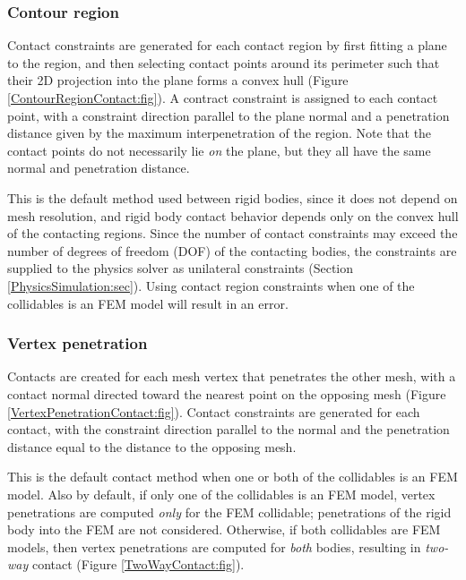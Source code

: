 \subsubsection{Contour region}
\label{ContourRegion:sec}

Contact constraints are generated for each contact region by first
fitting a plane to the region, and then selecting contact points
around its perimeter such that their 2D projection into the plane
forms a convex hull (Figure \ref{ContourRegionContact:fig}).  A
contract constraint is assigned to each contact point, with a
constraint direction parallel to the plane normal and a penetration
distance given by the maximum interpenetration of the region. Note
that the contact points do not necessarily lie {\it on} the plane, but
they all have the same normal and penetration distance.

This is the default method used between rigid bodies, since it does
not depend on mesh resolution, and rigid body contact behavior depends
only on the convex hull of the contacting regions. Since the number of
contact constraints may exceed the number of degrees of freedom (DOF)
of the contacting bodies, the constraints are supplied to the physics
solver as unilateral constraints
(Section \ref{PhysicsSimulation:sec}).  Using contact region
constraints when one of the collidables is an FEM model will result in
an error.

\subsubsection{Vertex penetration}
\label{VertexPenetration:sec}

Contacts are created for each mesh vertex that penetrates the other
mesh, with a contact normal directed toward the nearest point on the
opposing mesh (Figure \ref{VertexPenetrationContact:fig}).  Contact
constraints are generated for each contact, with the constraint
direction parallel to the normal and the penetration distance equal to
the distance to the opposing mesh.

This is the default contact method when one or both of the
collidables is an FEM model. Also by default, if only one of the
collidables is an FEM model, vertex penetrations are computed {\it
only} for the FEM collidable; penetrations of the rigid body into the
FEM are not considered. Otherwise, if both collidables are FEM models,
then vertex penetrations are computed for {\it both} bodies, resulting
in {\it two-way} contact (Figure \ref{TwoWayContact:fig}).  

